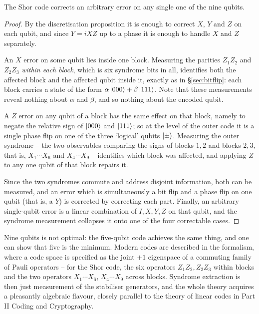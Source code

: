 \documentclass[a4paper]{scrartcl}
\begin{document}
\begin{theorem}
	The Shor code corrects an arbitrary error on any single one of the nine qubits.
\end{theorem}

\begin{proof}
	By the discretisation proposition it is enough to correct $X$, $Y$ and $Z$ on each qubit, and since $Y = iXZ$ up to a phase it is enough to handle $X$ and $Z$ separately.

	An $X$ error on some qubit lies inside one block. Measuring the parities $Z_1Z_2$ and $Z_2Z_3$ \emph{within each block}, which is six syndrome bits in all, identifies both the affected block and the affected qubit inside it, exactly as in \S\ref{sec:bitflip}: each block carries a state of the form $\alpha\ket{000}+\beta\ket{111}$. Note that these measurements reveal nothing about $\alpha$ and $\beta$, and so nothing about the encoded qubit.

	A $Z$ error on any qubit of a block has the same effect on that block, namely to negate the relative sign of $\ket{000}$ and $\ket{111}$; so at the level of the outer code it is a single phase flip on one of the three `logical' qubits $\ket\pm$. Measuring the outer syndrome -- the two observables comparing the signs of blocks $1,2$ and blocks $2,3$, that is, $X_1\cdots X_6$ and $X_4\cdots X_9$ -- identifies which block was affected, and applying $Z$ to any one qubit of that block repairs it.

	Since the two syndromes commute and address disjoint information, both can be measured, and an error which is simultaneously a bit flip and a phase flip on one qubit (that is, a $Y$) is corrected by correcting each part. Finally, an arbitrary single-qubit error is a linear combination of $I,X,Y,Z$ on that qubit, and the syndrome measurement collapses it onto one of the four correctable cases.
\end{proof}

\begin{remark}
	Nine qubits is not optimal: the five-qubit code achieves the same thing, and one can show that five is the minimum. Modern codes are described in the  formalism, where a code space is specified as the joint $+1$ eigenspace of a commuting family of Pauli operators -- for the Shor code, the six operators $Z_1Z_2, Z_2Z_3$ within blocks and the two operators $X_1\cdots X_6$, $X_4\cdots X_9$ across blocks. Syndrome extraction is then just measurement of the stabiliser generators, and the whole theory acquires a pleasantly algebraic flavour, closely parallel to the theory of linear codes in Part II Coding and Cryptography.
\end{remark}
\end{document}
